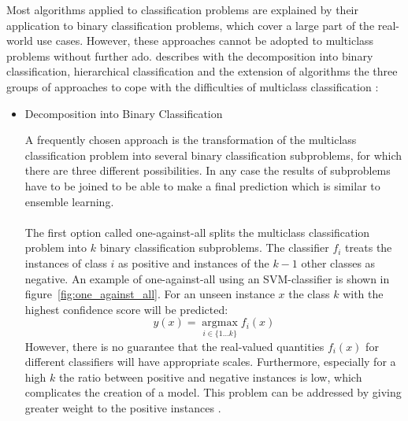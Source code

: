 \documentclass[article,type=msc,colorback,accentcolor=tud7b]{tudthesis}
\begin{document}
    Most algorithms applied to classification problems are explained by their application to binary classification problems, which cover a large part of the real-world use cases. However, these approaches cannot be adopted to multiclass problems without further ado. \citeauthor{Aly2005} describes with the decomposition into binary classification, hierarchical classification and the extension of algorithms the three groups of approaches to cope with the difficulties of multiclass classification \autocite{Aly2005}:
    \begin{itemize}
      \item Decomposition into Binary Classification

        A frequently chosen approach is the transformation of the multiclass classification problem into several binary classification subproblems, for which there are three different possibilities. In any case the results of subproblems have to be joined to be able to make a final prediction which is similar to ensemble learning. \\\\
        The first option called one-against-all splits the multiclass classification problem into $k$ binary classification subproblems. The classifier $f_{i}$ treats the instances of class $i$ as positive and instances of the $k-1$ other classes as negative. An example of one-against-all using an SVM-classifier is shown in figure~\ref{fig:one_against_all}. For an unseen instance $x$ the class $k$ with the highest confidence score will be predicted:
        \[y(x)=\underset{i\in\{1 \dots k\}}{\operatorname{argmax}} f_{i}(x)\]
        However, there is no guarantee that the real-valued quantities $f_{i}(x)$ for different classifiers will have appropriate scales. Furthermore, especially for a high $k$ the ratio between positive and negative instances is low, which complicates the creation of a model. This problem can be addressed by giving greater weight to the positive instances \autocite[Subsection~7.1.3]{Bishop2006}.


\end{itemize}
\end{document}
